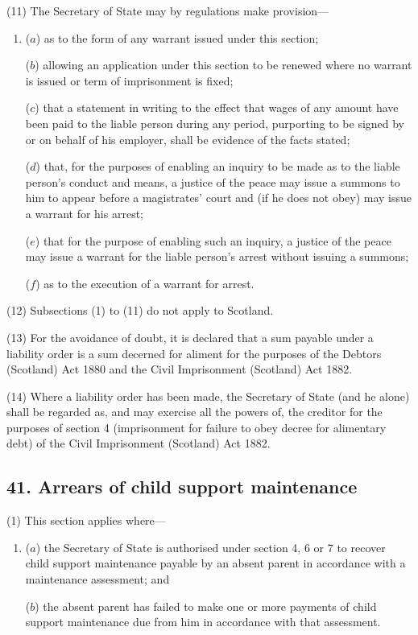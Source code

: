 \documentclass[12pt,a4paper]{article}
\begin{document}
(11) The Secretary of State may by regulations make provision—
\begin{enumerate}\item[]
($a$) as to the form of any warrant issued under this section;

($b$) allowing an application under this section to be renewed where no warrant is issued or term of imprisonment is fixed;

($c$) that a statement in writing to the effect that wages of any amount have been paid to the liable person during any period, purporting to be signed by or on behalf of his employer, shall be evidence of the facts stated;

($d$) that, for the purposes of enabling an inquiry to be made as to the liable person’s conduct and means, a justice of the peace may issue a summons to him to appear before a magistrates' court and (if he does not obey) may issue a warrant for his arrest;

($e$) that for the purpose of enabling such an inquiry, a justice of the peace may issue a warrant for the liable person’s arrest without issuing a summons;

($f$) as to the execution of a warrant for arrest.
\end{enumerate}

(12) Subsections (1)  to (11)  do not apply to Scotland.

(13) For the avoidance of doubt, it is declared that a sum payable under a liability order is a sum decerned for aliment for the purposes of the Debtors (Scotland) Act 1880 and the Civil Imprisonment (Scotland) Act 1882.

(14) Where a liability order has been made, the Secretary of State (and he alone) shall be regarded as, and may exercise all the powers of, the creditor for the purposes of section 4 (imprisonment for failure to obey decree for alimentary debt) of the Civil Imprisonment (Scotland) Act 1882.


\subsection{41. Arrears of child support maintenance}

(1) This section applies where—
\begin{enumerate}\item[]
($a$) the Secretary of State is authorised under section 4, 6 or 7 to recover child support maintenance payable by an absent parent in accordance with a maintenance assessment; and

($b$) the absent parent has failed to make one or more payments of child support maintenance due from him in accordance with that assessment.
\end{enumerate}
\end{document}
